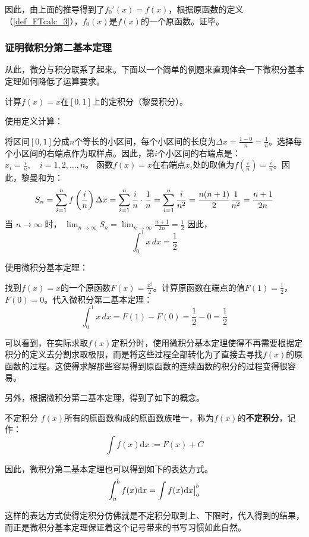 因此，由上面的推导得到了$f_0'(x)=f(x)$，根据原函数的定义（\autoref{def_FTcalc_3}），$f_0(x)$是$f(x)$的一个原函数。证毕。

\subsubsection{证明微积分第二基本定理}

\issueTODO

从此，微分与积分联系了起来。下面以一个简单的例题来直观体会一下微积分基本定理如何降低了运算要求。

\begin{example}{}
计算$f(x)=x$在$[0,1]$上的定积分（黎曼积分）。
\end{example}

使用定义计算：

将区间$[0, 1]$分成$n$个等长的小区间，每个小区间的长度为$\Delta x = \frac{1 - 0}{n} = \frac{1}{n}$。选择每个小区间的右端点作为取样点。因此，第$i$个小区间的右端点是：$x_i = \frac{i}{n}, \quad i = 1, 2, \ldots, n$。
函数$f(x) = x$在右端点$x_i$处的取值为$f\left(\frac{i}{n} \right)=\frac{i}{n}$。因此，黎曼和为：
$$S_n = \sum_{i=1}^n f\left( \frac{i}{n} \right) \Delta x = \sum_{i=1}^n \frac{i}{n} \cdot \frac{1}{n} = \sum_{i=1}^n \frac{i}{n^2}=\frac{n(n+1)}{2}{1\over n^2} = \frac{n+1}{2n}$$
当 $ n \to \infty $ 时，
$\lim_{n \to \infty} S_n = \lim_{n \to \infty} \frac{n+1}{2n}= \frac{1}{2}$
因此，$$\int_0^1 x \, dx = \frac{1}{2}$$

使用微积分基本定理：

找到$f(x) = x$的一个原函数$F(x)=\frac{x^2}{2}$。计算原函数在端点的值$F(1) =\frac{1}{2}$，$F(0) = 0$。代入微积分第二基本定理：
$$\int_0^1 x \, dx = F(1) - F(0) = \frac{1}{2} - 0 = \frac{1}{2}$$

可以看到，在实际求取$f(x)$定积分时，使用微积分基本定理使得不再需要根据定积分的定义去分割求取极限，而是将这些过程全部转化为了直接去寻找$f(x)$的原函数的过程。这使得求解那些容易得到原函数的连续函数的积分的过程变得很容易。

另外，根据微积分第二基本定理，得到了如下的概念。

\begin{definition}{不定积分}
$f(x)$所有的原函数构成的原函数族唯一，称为$f(x)$的\textbf{不定积分}，记作：
$$\int f(x)\mathrm {d}x:=F(x)+C$$
\end{definition}

因此，微积分第二基本定理也可以得到如下的表达方式。
$$\int_{a}^{b} f(x)\mathrm {d}x=\int f(x)\mathrm {d}x\big{|}_{a}^{b}$$

这样的表达方式使得定积分仿佛就是不定积分取到上、下限时，代入得到的结果，而正是微积分基本定理保证着这个记号带来的书写习惯如此自然。
